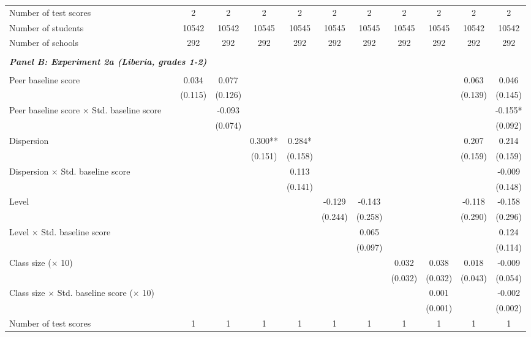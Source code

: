\begin{center}
\begin{scriptsize}
\begin{threeparttable}
\begin{tabular} {@{} l l c c c c c c c c c c  @{}}
\midrule
Number of test scores &  & 2 & 2 & 2 & 2 & 2 & 2 & 2 & 2 & 2 & 2 \\
Number of students &  & 10542 & 10542 & 10545 & 10545 & 10545 & 10545 & 10545 & 10545 & 10542 & 10542 \\
Number of schools &  & 292 & 292 & 292 & 292 & 292 & 292 & 292 & 292 & 292 & 292 \\
 \midrule
\\
\multicolumn{3}{l}{\textbf{\textit{Panel B: Experiment 2a (Liberia, grades 1-2)}}} \\
\\
Peer baseline score &  & 0.034 & 0.077 &  &  &  &  &  &  & 0.063 & 0.046 \\
                 &  & (0.115) & (0.126) &  &  &  &  &  &  & (0.139) & (0.145) \\
Peer baseline score $\times$ Std. baseline score &  &  & -0.093 &  &  &  &  &  &  &  & -0.155* \\
                 &  &  & (0.074) &  &  &  &  &  &  &  & (0.092) \\
Dispersion &  &  &  & 0.300** & 0.284* &  &  &  &  & 0.207 & 0.214 \\
                 &  &  &  & (0.151) & (0.158) &  &  &  &  & (0.159) & (0.159) \\
Dispersion $\times$ Std. baseline score &  &  &  &  & 0.113 &  &  &  &  &  & -0.009 \\
                 &  &  &  &  & (0.141) &  &  &  &  &  & (0.148) \\
Level &  &  &  &  &  & -0.129 & -0.143 &  &  & -0.118 & -0.158 \\
                 &  &  &  &  &  & (0.244) & (0.258) &  &  & (0.290) & (0.296) \\
Level $\times$ Std. baseline score &  &  &  &  &  &  & 0.065 &  &  &  & 0.124 \\
                 &  &  &  &  &  &  & (0.097) &  &  &  & (0.114) \\
Class size ($\times$ 10) &  &  &  &  &  &  &  & 0.032 & 0.038 & 0.018 & -0.009 \\
                 &  &  &  &  &  &  &  & (0.032) & (0.032) & (0.043) & (0.054) \\
Class size $\times$ Std. baseline score ($\times$ 10) &  &  &  &  &  &  &  &  & 0.001 &  & -0.002 \\
                 &  &  &  &  &  &  &  &  & (0.001) &  & (0.002) \\
\midrule
Number of test scores &  & 1 & 1 & 1 & 1 & 1 & 1 & 1 & 1 & 1 & 1 \\

\end{tabular}
\end{threeparttable}
\end{scriptsize}
\end{center}
